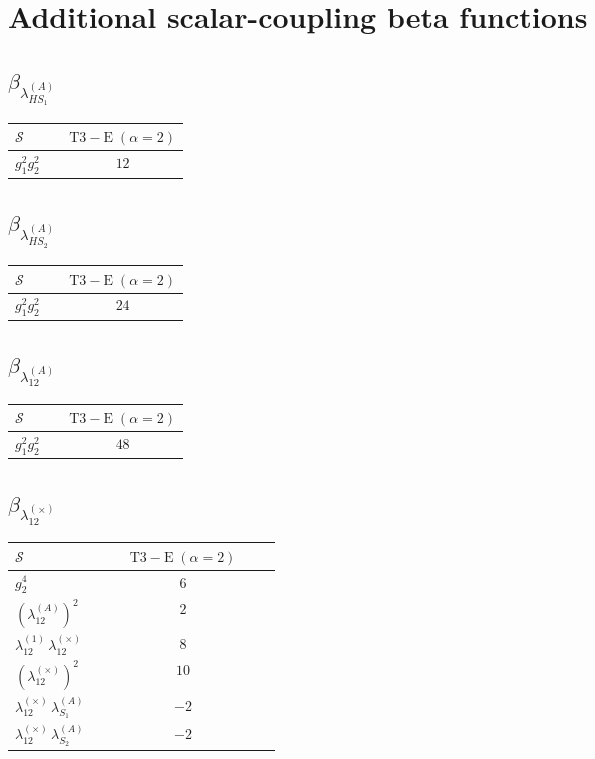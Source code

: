 \documentclass[9pt]{article}
\begin{document}
\section*{Additional scalar-coupling beta functions}
\subsection*{$ \beta_{\lambda_{HS_1}^{(A)}} $}
\begin{longtable}{@{}p{0.31\linewidth}c@{}}
\toprule
$\mathcal{S}$ & $ \mathrm{T3-E}\;(\alpha=2) $ \\
\midrule
$ g_1^2g_2^2 $ & $ 12 $ \\
\bottomrule
\end{longtable}
\subsection*{$ \beta_{\lambda_{HS_2}^{(A)}} $}
\begin{longtable}{@{}p{0.31\linewidth}c@{}}
\toprule
$\mathcal{S}$ & $ \mathrm{T3-E}\;(\alpha=2) $ \\
\midrule
$ g_1^2g_2^2 $ & $ 24 $ \\
\bottomrule
\end{longtable}
\subsection*{$ \beta_{\lambda_{12}^{(A)}} $}
\begin{longtable}{@{}p{0.31\linewidth}c@{}}
\toprule
$\mathcal{S}$ & $ \mathrm{T3-E}\;(\alpha=2) $ \\
\midrule
$ g_1^2g_2^2 $ & $ 48 $ \\
\bottomrule
\end{longtable}
\subsection*{$ \beta_{\lambda_{12}^{(\times)}} $}
\begin{longtable}{@{}p{0.31\linewidth}c@{}}
\toprule
$\mathcal{S}$ & $ \mathrm{T3-E}\;(\alpha=2) $ \\
\midrule
$ g_2^4 $ & $ 6 $ \\
$ \left(\lambda_{12}^{(A)}\right)^2 $ & $ 2 $ \\
$ \lambda_{12}^{(1)}\,\lambda_{12}^{(\times)} $ & $ 8 $ \\
$ \left(\lambda_{12}^{(\times)}\right)^2 $ & $ 10 $ \\
$ \lambda_{12}^{(\times)}\,\lambda_{S_1}^{(A)} $ & $ -2 $ \\
$ \lambda_{12}^{(\times)}\,\lambda_{S_2}^{(A)} $ & $ -2 $ \\
\bottomrule
\end{longtable}
\end{document}
